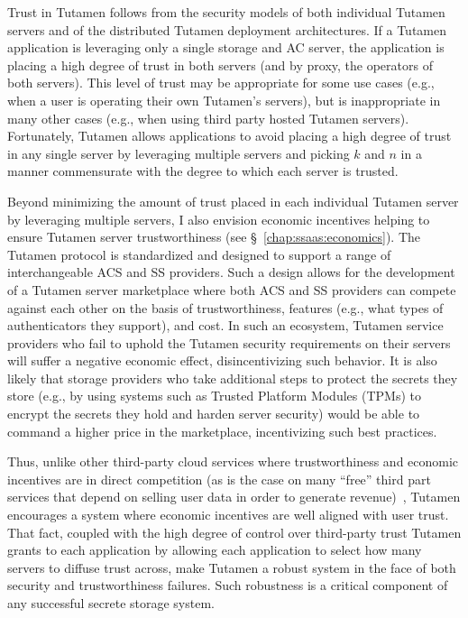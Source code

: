 Trust in Tutamen follows from the security models of both individual
Tutamen servers and of the distributed Tutamen deployment
architectures. If a Tutamen application is leveraging only a single
storage and AC server, the application is placing a high degree of
trust in both servers (and by proxy, the operators of both
servers). This level of trust may be appropriate for some use cases
(e.g., when a user is operating their own Tutamen's servers), but is
inappropriate in many other cases (e.g., when using third party hosted
Tutamen servers). Fortunately, Tutamen allows applications to avoid
placing a high degree of trust in any single server by leveraging
multiple servers and picking $k$ and $n$ in a manner commensurate with
the degree to which each server is trusted.

Beyond minimizing the amount of trust placed in each individual
Tutamen server by leveraging multiple servers, I also envision
economic incentives helping to ensure Tutamen server trustworthiness
(see \S~\ref{chap:ssaas:economics}). The Tutamen protocol is
standardized and designed to support a range of interchangeable ACS
and SS providers. Such a design allows for the development of a
Tutamen server marketplace where both ACS and SS providers can compete
against each other on the basis of trustworthiness, features (e.g.,
what types of authenticators they support), and cost. In such an
ecosystem, Tutamen service providers who fail to uphold the Tutamen
security requirements on their servers will suffer a negative economic
effect, disincentivizing such behavior. It is also likely that storage
providers who take additional steps to protect the secrets they store
(e.g., by using systems such as Trusted Platform Modules (TPMs) to
encrypt the secrets they hold and harden server security) would be
able to command a higher price in the marketplace, incentivizing such
best practices.

Thus, unlike other third-party cloud services where trustworthiness
and economic incentives are in direct competition (as is the case on
many ``free'' third part services that depend on selling user data in
order to generate revenue)~\cite{flowerday2006}, Tutamen encourages a
system where economic incentives are well aligned with user
trust. That fact, coupled with the high degree of control over
third-party trust Tutamen grants to each application by allowing each
application to select how many servers to diffuse trust across, make
Tutamen a robust system in the face of both security and
trustworthiness failures. Such robustness is a critical component of
any successful secrete storage system.


